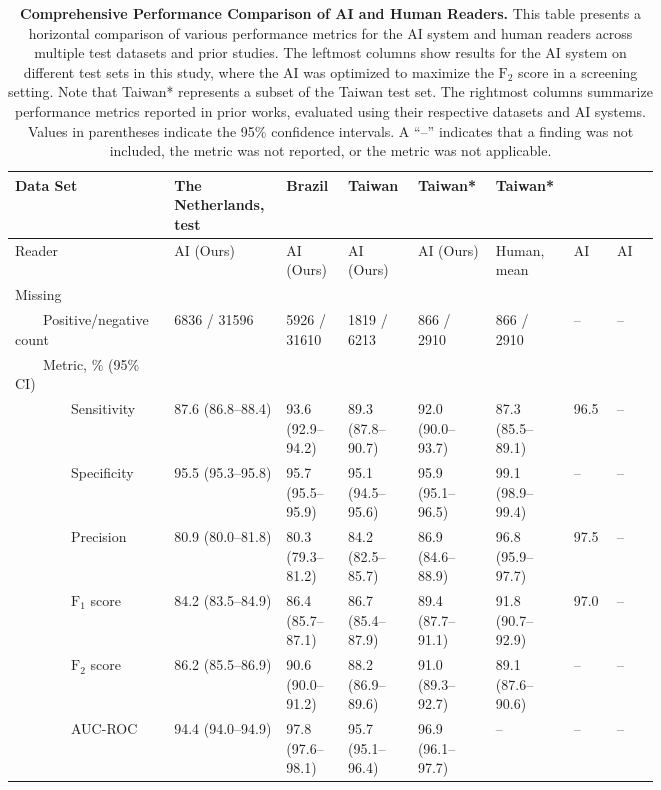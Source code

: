 \begin{table}[!h]
\centering\caption{  \textbf{Comprehensive Performance Comparison of AI and Human Readers.}   This table presents a horizontal comparison of various performance metrics for the AI system and human readers across multiple test datasets and prior studies.  The leftmost columns show results for the AI system on different test sets in this study, where the AI was optimized to maximize the $\textrm{F}_2$ score in a screening setting.  Note that Taiwan* represents a subset of the Taiwan test set.  The rightmost columns summarize performance metrics reported in prior works, evaluated using their respective datasets and AI systems.  Values in parentheses indicate the 95\% confidence intervals.  A ``--'' indicates that a finding was not included, the metric was not reported, or the metric was not applicable.}\label{tbl:ai-multinational}\tiny{}
\begin{tabular}{ p{0.167\linewidth}p{0.117\linewidth}p{0.083\linewidth}p{0.083\linewidth}p{0.083\linewidth}p{0.083\linewidth}|p{0.067\linewidth}p{0.067\linewidth} }
\toprule
Data Set & The Netherlands, test & Brazil & Taiwan & Taiwan* & Taiwan* & \citet{vinayahalingam2021automated} & \citet{bacsaran2022diagnostic} \\ \midrule
Reader & AI (Ours) & AI (Ours) & AI (Ours) & AI (Ours) & Human, mean & AI~\citep{vinayahalingam2021automated} & AI~\citep{bacsaran2022diagnostic} \\ \midrule
Missing &   &   &   &   &   &   &   \\
{~~~~}Positive/negative count & \num{6836} / \num{31596} & \num{5926} / \num{31610} & \num{1819} / \num{6213} & \num{866} / \num{2910} & \num{866} / \num{2910} & -- & -- \\
{~~~~}Metric, \% (95\% CI) &   &   &   &   &   &   &   \\
{~~~~~~~~}Sensitivity & 87.6 {(86.8--88.4)} & 93.6 {(92.9--94.2)} & 89.3 {(87.8--90.7)} & 92.0 {(90.0--93.7)} & 87.3 {(85.5--89.1)} & 96.5 & -- \\
{~~~~~~~~}Specificity & 95.5 {(95.3--95.8)} & 95.7 {(95.5--95.9)} & 95.1 {(94.5--95.6)} & 95.9 {(95.1--96.5)} & 99.1 {(98.9--99.4)} & -- & -- \\
{~~~~~~~~}Precision & 80.9 {(80.0--81.8)} & 80.3 {(79.3--81.2)} & 84.2 {(82.5--85.7)} & 86.9 {(84.6--88.9)} & 96.8 {(95.9--97.7)} & 97.5 & -- \\
{~~~~~~~~}$\textrm{F}_1$ score & 84.2 {(83.5--84.9)} & 86.4 {(85.7--87.1)} & 86.7 {(85.4--87.9)} & 89.4 {(87.7--91.1)} & 91.8 {(90.7--92.9)} & 97.0 & -- \\
{~~~~~~~~}$\textrm{F}_2$ score & 86.2 {(85.5--86.9)} & 90.6 {(90.0--91.2)} & 88.2 {(86.9--89.6)} & 91.0 {(89.3--92.7)} & 89.1 {(87.6--90.6)} & -- & -- \\
{~~~~~~~~}AUC-ROC & 94.4 {(94.0--94.9)} & 97.8 {(97.6--98.1)} & 95.7 {(95.1--96.4)} & 96.9 {(96.1--97.7)} & -- & -- & -- \\ \midrule


\end{tabular}
\end{table}
